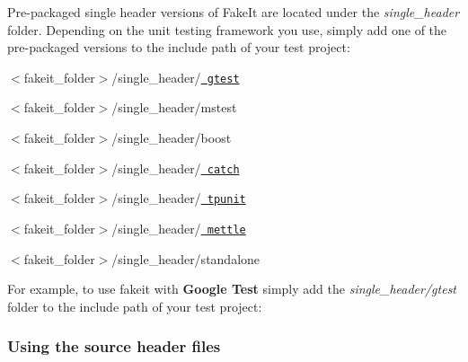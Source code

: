 Pre-\/packaged single header versions of Fake\+It are located under the {\itshape single\+\_\+header} folder. Depending on the unit testing framework you use, simply add one of the pre-\/packaged versions to the include path of your test project\+:
\begin{DoxyItemize}
\item $<$fakeit\+\_\+folder$>$/single\+\_\+header/\href{https://github.com/google/googletest}{\texttt{ gtest}}
\item $<$fakeit\+\_\+folder$>$/single\+\_\+header/mstest
\item $<$fakeit\+\_\+folder$>$/single\+\_\+header/boost
\item $<$fakeit\+\_\+folder$>$/single\+\_\+header/\href{https://github.com/philsquared/Catch}{\texttt{ catch}}
\item $<$fakeit\+\_\+folder$>$/single\+\_\+header/\href{https://github.com/tpounds/tpunitpp}{\texttt{ tpunit}}
\item $<$fakeit\+\_\+folder$>$/single\+\_\+header/\href{https://github.com/jimporter/mettle}{\texttt{ mettle}}
\item $<$fakeit\+\_\+folder$>$/single\+\_\+header/standalone
\end{DoxyItemize}

For example, to use fakeit with {\bfseries{Google Test}} simply add the {\itshape single\+\_\+header/gtest} folder to the include path of your test project\+: 
\begin{DoxyCode}{0}
\end{DoxyCode}
 \subsubsection*{Using the source header files}

